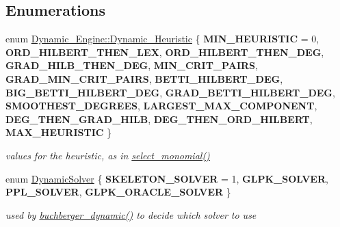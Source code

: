 \subsection*{Enumerations}
\begin{DoxyCompactItemize}
\item 
enum \hyperlink{group___g_b_computation_ga819b1fd40d9a40ff303df3b90647ecb0}{Dynamic\+\_\+\+Engine\+::\+Dynamic\+\_\+\+Heuristic} \{ \newline
{\bfseries M\+I\+N\+\_\+\+H\+E\+U\+R\+I\+S\+T\+IC} = 0, 
{\bfseries O\+R\+D\+\_\+\+H\+I\+L\+B\+E\+R\+T\+\_\+\+T\+H\+E\+N\+\_\+\+L\+EX}, 
{\bfseries O\+R\+D\+\_\+\+H\+I\+L\+B\+E\+R\+T\+\_\+\+T\+H\+E\+N\+\_\+\+D\+EG}, 
{\bfseries G\+R\+A\+D\+\_\+\+H\+I\+L\+B\+\_\+\+T\+H\+E\+N\+\_\+\+D\+EG}, 
\newline
{\bfseries M\+I\+N\+\_\+\+C\+R\+I\+T\+\_\+\+P\+A\+I\+RS}, 
{\bfseries G\+R\+A\+D\+\_\+\+M\+I\+N\+\_\+\+C\+R\+I\+T\+\_\+\+P\+A\+I\+RS}, 
{\bfseries B\+E\+T\+T\+I\+\_\+\+H\+I\+L\+B\+E\+R\+T\+\_\+\+D\+EG}, 
{\bfseries B\+I\+G\+\_\+\+B\+E\+T\+T\+I\+\_\+\+H\+I\+L\+B\+E\+R\+T\+\_\+\+D\+EG}, 
\newline
{\bfseries G\+R\+A\+D\+\_\+\+B\+E\+T\+T\+I\+\_\+\+H\+I\+L\+B\+E\+R\+T\+\_\+\+D\+EG}, 
{\bfseries S\+M\+O\+O\+T\+H\+E\+S\+T\+\_\+\+D\+E\+G\+R\+E\+ES}, 
{\bfseries L\+A\+R\+G\+E\+S\+T\+\_\+\+M\+A\+X\+\_\+\+C\+O\+M\+P\+O\+N\+E\+NT}, 
{\bfseries D\+E\+G\+\_\+\+T\+H\+E\+N\+\_\+\+G\+R\+A\+D\+\_\+\+H\+I\+LB}, 
\newline
{\bfseries D\+E\+G\+\_\+\+T\+H\+E\+N\+\_\+\+O\+R\+D\+\_\+\+H\+I\+L\+B\+E\+RT}, 
{\bfseries M\+A\+X\+\_\+\+H\+E\+U\+R\+I\+S\+T\+IC}
 \}\begin{DoxyCompactList}\small\item\em values for the heuristic, as in {\ttfamily \hyperlink{group___g_b_computation_gaa01d88c431b84deabf51ee116d7d2a0e}{select\+\_\+monomial()}} \end{DoxyCompactList}
\item 
enum \hyperlink{group___g_b_computation_ga28fbbb9eb7d8b80ced05c8fa89b2bdac}{Dynamic\+Solver} \{ {\bfseries S\+K\+E\+L\+E\+T\+O\+N\+\_\+\+S\+O\+L\+V\+ER} = 1, 
{\bfseries G\+L\+P\+K\+\_\+\+S\+O\+L\+V\+ER}, 
{\bfseries P\+P\+L\+\_\+\+S\+O\+L\+V\+ER}, 
{\bfseries G\+L\+P\+K\+\_\+\+O\+R\+A\+C\+L\+E\+\_\+\+S\+O\+L\+V\+ER}
 \}\begin{DoxyCompactList}\small\item\em used by \hyperlink{group___g_b_computation_ga2c05f4e2ea8b43bb696483469f4cce83}{buchberger\+\_\+dynamic()} to decide which solver to use \end{DoxyCompactList}

\end{DoxyCompactItemize}
